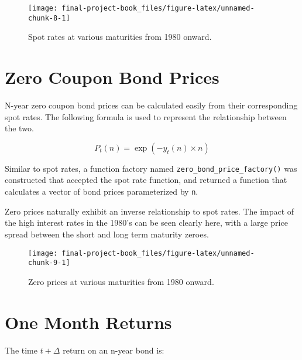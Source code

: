 \documentclass[openany]{book}
\theoremstyle{definition}
\theoremstyle{definition}
\theoremstyle{definition}
\theoremstyle{remark}
\begin{document}
\small

\begin{figure}[H]

{\centering \texttt{[image: final-project-book\_files/figure-latex/unnamed-chunk-8-1]} 

}

\caption{Spot rates at various maturities from 1980 onward.}\label{fig:unnamed-chunk-8}
\end{figure}

\normalsize

\hypertarget{zero-coupon-bond-prices}{%
\section{Zero Coupon Bond Prices}\label{zero-coupon-bond-prices}}

N-year zero coupon bond prices can be calculated easily from their
corresponding spot rates. The following formula is used to represent the
relationship between the two.

\[ P_t(n) = \exp(-y_t(n) \times n) \]

Similar to spot rates, a function factory named
\texttt{zero\_bond\_price\_factory()} was constructed that accepted the
spot rate function, and returned a function that calculates a vector of
bond prices parameterized by \texttt{n}.

Zero prices naturally exhibit an inverse relationship to spot rates. The
impact of the high interest rates in the 1980's can be seen clearly
here, with a large price spread between the short and long term maturity
zeroes.

\small

\begin{figure}[H]

{\centering \texttt{[image: final-project-book\_files/figure-latex/unnamed-chunk-9-1]} 

}

\caption{Zero prices at various maturities from 1980 onward.}\label{fig:unnamed-chunk-9}
\end{figure}

\normalsize

\hypertarget{one-month-returns}{%
\section{One Month Returns}\label{one-month-returns}}

The time \(t+\Delta\) return on an n-year bond is:
\end{document}
